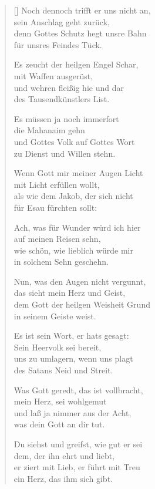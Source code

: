 \begin{multicols}{2}
\begin{verse}[\versewidth]
 Noch dennoch trifft er uns nicht an,\\
sein Anschlag geht zurück,\\
denn Gottes Schutz hegt unsre Bahn\\
für unsres Feindes Tück.

 Es zeucht der heilgen Engel Schar,\\
mit Waffen ausgerüst,\\
und wehren fleißig hie und dar\\
des Tausendkünstlers List.

 Es müssen ja noch immerfort\\
die Mahanaim gehn\\
und Gottes Volk auf Gottes Wort\\
zu Dienst und Willen stehn.

 Wenn Gott mir meiner Augen Licht\\
mit Licht erfüllen wollt,\\
als wie dem Jakob, der sich nicht\\
für Esau fürchten sollt:

 Ach, was für Wunder würd ich hier\\
auf meinen Reisen sehn,\\
wie schön, wie lieblich würde mir\\
in solchem Sehn geschehn.

 Nun, was den Augen nicht vergunnt,\\
das sieht mein Herz und Geist,\\
dem Gott der heilgen Weisheit Grund\\
in seinem Geiste weist.

 Es ist sein Wort, er hats gesagt:\\
Sein Heervolk sei bereit,\\
uns zu umlagern, wenn uns plagt\\
des Satans Neid und Streit.

 Was Gott geredt, das ist vollbracht,\\
mein Herz, sei wohlgemut\\
und laß ja nimmer aus der Acht,\\
was dein Gott an dir tut.

 Du siehst und greifst, wie gut er sei\\
dem, der ihn ehrt und liebt,\\
er ziert mit Lieb, er führt mit Treu\\
ein Herz, das ihm sich gibt.


\end{verse}
\end{multicols}
